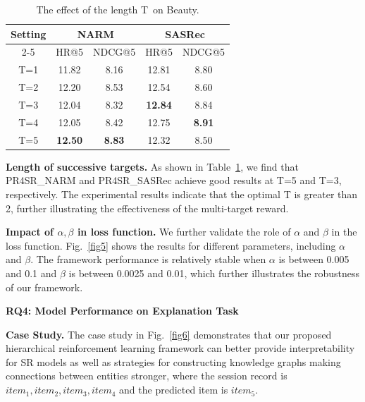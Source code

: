 \documentclass[10pt,journal,compsoc]{IEEEtran}
\begin{document}
\begin{table}[!h]
\centering
\caption{The effect of the length \textbar T\textbar\ on Beauty.}
\begin{tabular}{|c|cc|cc|}
\hline
\multicolumn{1}{|c|}{\multirow{2}{*}{Setting}} & \multicolumn{2}{c|}{NARM}                   & \multicolumn{2}{c|}{SASRec}                \\ \cline{2-5} 
\multicolumn{1}{|c|}{}                          & \multicolumn{1}{l|}{HR@5} & NDCG@5          & \multicolumn{1}{l|}{HR@5} & NDCG@5         \\ \hline
T=1                                             & 11.82                   & 8.16         & 12.81                  & 8.80         \\
T=2                                             & 12.20                   & 8.53          & 12.54                   & 8.60         \\
T=3                                             & 12.04                   & 8.32           & \textbf{12.84}          & 8.84         \\
T=4                                             & 12.05                   & 8.42          & 12.75                   & \textbf{8.91} \\
T=5                                             & \textbf{12.50}          & \textbf{8.83} & 12.32                   & 8.50   \\ \hline
\end{tabular}
\label{table8}
\end{table}

\textbf{Length of successive targets.} As shown in Table~\ref{table8}, we find that PR4SR\_NARM and PR4SR\_SASRec achieve good results at T=5 and T=3, respectively. The experimental results indicate that the optimal T is greater than 2, further illustrating the effectiveness of the multi-target reward.

\textbf{Impact of $\alpha,\beta$ in loss function.} We further validate the role of $\alpha$ and $\beta$ in the loss function. Fig.~\ref{fig5} shows the results for different parameters, including $\alpha$  and $\beta$. The framework performance is  relatively stable when $\alpha$ is between 0.005 and 0.1 and $\beta$ is between 0.0025 and 0.01, which further illustrates the robustness of our framework.

\noindent \textbf{RQ4: Model Performance on Explanation Task}

\textbf{Case Study.} The case study in Fig.~\ref{fig6} demonstrates that our proposed hierarchical reinforcement learning framework can better provide interpretability for SR models as well as strategies for constructing knowledge graphs making connections between entities stronger, where the session record is ${item_1,item_2,item_3,item_4}$ and the predicted item is $item_5$.
\end{document}
